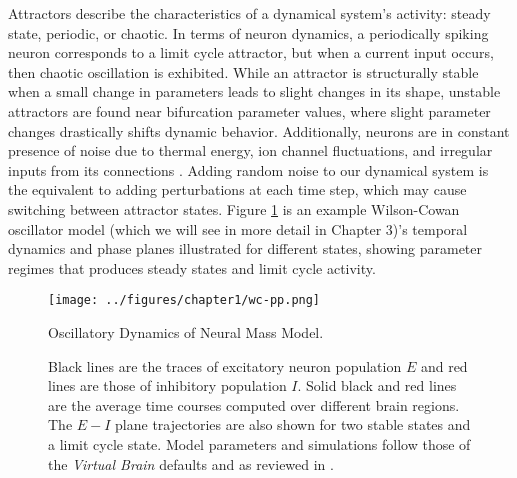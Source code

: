 Attractors describe the characteristics of a dynamical system's activity: steady state, periodic, or chaotic. In terms of neuron dynamics, a periodically spiking neuron corresponds to a limit cycle attractor, but when a current input occurs, then chaotic oscillation is exhibited. While an attractor is structurally stable when a small change in parameters leads to slight changes in its shape, unstable attractors are found near bifurcation parameter values, where slight parameter changes drastically shifts dynamic behavior. Additionally, neurons are in constant presence of noise due to thermal energy, ion channel fluctuations, and irregular inputs from its connections \cite{faisal2008noise,mivsic2010brain}. Adding random noise to our dynamical system is the equivalent to adding perturbations at each time step, which may cause switching between attractor states. Figure \ref{fig:wc-pp} is an example Wilson-Cowan oscillator model (which we will see in more detail in Chapter 3)'s temporal dynamics and phase planes illustrated for different states, showing parameter regimes that produces steady states and limit cycle activity. 

\begin{figure}[htbp]
	\centering
	\texttt{[image: ../figures/chapter1/wc-pp.png]}
	\caption{Oscillatory Dynamics of Neural Mass Model.}
	\caption*{Black lines are the traces of excitatory neuron population $E$ and red lines are those of inhibitory population $I$. Solid black and red lines are the average time courses computed over different brain regions. The $E-I$ plane trajectories are also shown for two stable states and a limit cycle state. Model parameters and simulations follow those of the \emph{Virtual Brain} defaults and as reviewed in \cite{sanz-leon_mathematical_2015}.}
	\label{fig:wc-pp}
\end{figure}

